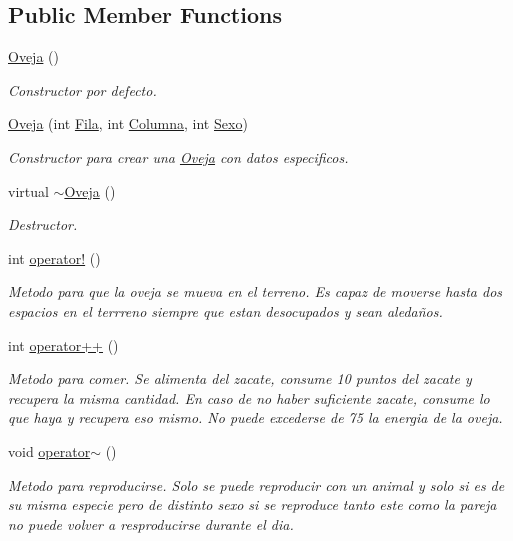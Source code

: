 \subsection*{Public Member Functions}
\begin{DoxyCompactItemize}
\item 
\hyperlink{classOveja_a816d51452247a98f55372b7407de0366}{Oveja} ()
\begin{DoxyCompactList}\small\item\em Constructor por defecto. \end{DoxyCompactList}\item 
\hyperlink{classOveja_a28cf77d31dc8d1770f52380a1ba1088e}{Oveja} (int \hyperlink{classAnimal_ab403adfd13b57143eff123bdd6a2febb}{Fila}, int \hyperlink{classAnimal_a340d64e6e4ffe5f35e0855c63aad1bd3}{Columna}, int \hyperlink{classAnimal_a42b629ae5a7e0c05263a3f6e592ea116}{Sexo})
\begin{DoxyCompactList}\small\item\em Constructor para crear una \hyperlink{classOveja}{Oveja} con datos especificos. \end{DoxyCompactList}\item 
virtual \hyperlink{classOveja_a90e76a79dba9138b13c26ba0b1b3c2cf}{$\sim$\+Oveja} ()
\begin{DoxyCompactList}\small\item\em Destructor. \end{DoxyCompactList}\item 
int \hyperlink{classOveja_a408a0da02f53481fa59dc592b5b60b6e}{operator!} ()
\begin{DoxyCompactList}\small\item\em Metodo para que la oveja se mueva en el terreno. Es capaz de moverse hasta dos espacios en el terrreno siempre que estan desocupados y sean aledaños. \end{DoxyCompactList}\item 
int \hyperlink{classOveja_a6faad614b717d9c5ad92e7787fee5419}{operator++} ()
\begin{DoxyCompactList}\small\item\em Metodo para comer. Se alimenta del zacate, consume 10 puntos del zacate y recupera la misma cantidad. En caso de no haber suficiente zacate, consume lo que haya y recupera eso mismo. No puede excederse de 75 la energia de la oveja. \end{DoxyCompactList}\item 
void \hyperlink{classOveja_a0ff5ac43f8a666b3b130de88da605fe2}{operator$\sim$} ()
\begin{DoxyCompactList}\small\item\em Metodo para reproducirse. Solo se puede reproducir con un animal y solo si es de su misma especie pero de distinto sexo si se reproduce tanto este como la pareja no puede volver a resproducirse durante el dia. \end{DoxyCompactList}\end{DoxyCompactItemize}
